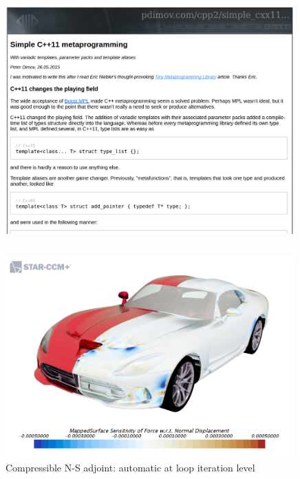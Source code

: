 \documentclass[xcolor=dvipsnames]{beamer}
\begin{document}
\begin{frame}[plain]
  \begin{columns}[T] %
    \begin{column}{0.9\textwidth}
      \begin{figure}[H]
        \centering
        \includegraphics[width=0.99\textwidth]{pdimov}
      \end{figure}
    \end{column}%
  \end{columns}
\end{frame}


\begin{frame}[plain]
      \begin{figure}[H]
        \centering
        \includegraphics[width=0.99\textwidth]{jag_surf_opt}
        \caption{Compressible N-S adjoint: automatic at loop iteration level}
      \end{figure}
\end{frame}
\end{document}
